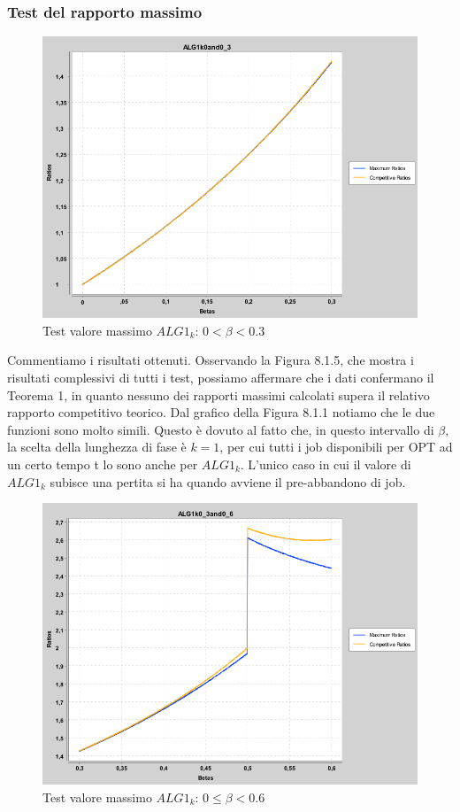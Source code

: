 \documentclass[12pt]{article}
\begin{document}
\subsubsection{Test del rapporto massimo}
\begin{figure}[H]
\caption{Test valore massimo $ALG1_{k}$: $0 < \beta < 0.3$}
\centering
\includegraphics[scale=0.4]{max/ALG1k0and0_3.png}
\end{figure}
Commentiamo i risultati ottenuti. Osservando la Figura 8.1.5, che mostra i risultati complessivi di tutti i test, possiamo affermare che i dati confermano il Teorema 1, in quanto nessuno dei rapporti massimi calcolati supera il relativo rapporto competitivo teorico.
Dal grafico della Figura 8.1.1 notiamo che le due funzioni sono molto simili. Questo è dovuto al fatto che, in questo intervallo di $\beta$, la scelta della lunghezza di fase è $k=1$, per cui tutti i job disponibili per OPT ad un certo tempo t lo sono anche per $ALG1_{k}$. L'unico caso in cui il valore di $ALG1_{k}$ subisce una pertita si ha quando avviene il pre-abbandono di job.
\begin{figure}[H]
\caption{Test valore massimo $ALG1_{k}$: $0 \leq \beta < 0.6$}
\centering
\includegraphics[scale=0.4]{max/ALG1k0_3and0_6.png}
\end{figure}
\end{document}
